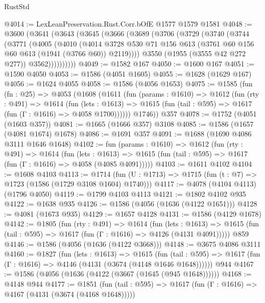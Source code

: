\begin{lexlean}{RustStd}
\begin{coremodule}
@4014 := LexLeanPreservation.Rust.Corr.bOfE @1577 @1579 @1581
@4048 := @3600
    (@3641
      (@3643
        (@3645
          (@3666
            (@3689
              (@3706
                (@3729
                  (@3740
                    (@3744
                      (@3771
                        (@4005
                          (@4010
                            (@4014
                              @3728
                              @530
                              @71
                              @156
                              @613
                              (@3761 @60 @156 @60 @613 (@1941 (@3766 @60)) @2119))))
                        @3550
                        (@1955 (@3555 @42 @272 @277))
                        @3562))))))))))
@4049 := @1582 @167
@4050 := @1600 @167
@4051 := @1590 @4050
@4053 := @1586 (@4051 @1605)
@4055 := @1628 (@1629 @167)
@4056 := @1624 @4055
@4058 := @1586 (@4056 @1653)
@4075 := @1585
    (fun (fn : @25) =>
    @4053
      (@1608
        (@1611
          (fun (params : @1610) =>
          @1612
            (fun (rty : @491) =>
            @1614
              (fun (lets : @1613) =>
              @1615 (fun (tail : @595) => @1617 (fun (Γ : @1616) => @4058 @1700))))))
        @1746))
    @357
@4078 := @1752 (@4051 (@1603 @357))
@4081 := @1665 (@1666 @357) @3108
@4085 := @1586 (@1657 (@4081 @1674) @1678)
@4086 := @1691 @357
@4091 := @1688 (@1690 @4086 @3111 @1646 @1648)
@4102 := fun (params : @1610) =>
  @1612
    (fun (rty : @491) =>
    @1614
      (fun (lets : @1613) =>
      @1615 (fun (tail : @595) => @1617 (fun (Γ : @1616) => @4058 (@4085 @4091)))))
@4103 := @1611 @4102
@4104 := @1608 @4103
@4113 := @1714 (fun (U : @1713) => @1715 (fun (t : @7) => @1723 (@1586 (@1729 @3108 @1604) @1740)))
@4117 := @4078 (@4104 @4113) (@1796 @4050)
@4119 := @1799 @4103 @4113
@4121 := @1802 @4102 @935
@4122 := @1638 @935
@4126 := @1586 (@4056 (@1636 (@4122 @1651)))
@4128 := @4081 (@1673 @935)
@4129 := @1657 @4128
@4131 := @1586 (@4129 @1678)
@4142 := @1805
    (fun (rty : @491) =>
    @1614
      (fun (lets : @1613) =>
      @1615 (fun (tail : @595) => @1617 (fun (Γ : @1616) => @4126 (@4131 @4091)))))
    @859
@4146 := @1586 (@4056 (@1636 (@4122 @3668)))
@4148 := @3675 @4086 @3111
@4160 := @1827
    (fun (lets : @1613) =>
    @1615
      (fun (tail : @595) => @1617 (fun (Γ : @1616) => @4146 (@4131 (@3674 (@4148 @1646 @1648))))))
    @944
@4167 := @1586 (@4056 (@1636 (@4122 (@3667 (@1645 (@945 @1648))))))
@4168 := @4148 @944
@4177 := @1851
    (fun (tail : @595) => @1617 (fun (Γ : @1616) => @4167 (@4131 (@3674 (@4168 @1648)))))

\end{coremodule}
\end{lexlean}
